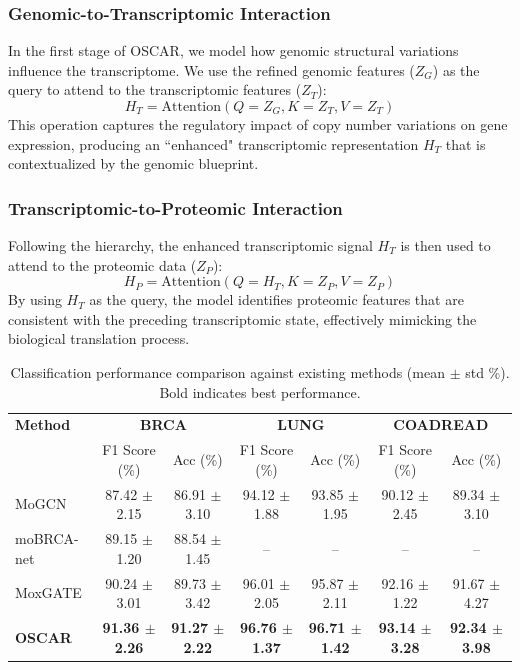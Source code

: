 \documentclass[lettersize,journal]{IEEEtran}
\begin{document}
\subsubsection{Genomic-to-Transcriptomic Interaction}
In the first stage of OSCAR, we model how genomic structural variations influence the transcriptome. We use the refined genomic features ($Z_G$) as the query to attend to the transcriptomic features ($Z_T$):
\begin{equation}
    H_T = \text{Attention}(Q=Z_G, K=Z_T, V=Z_T)
\end{equation}
This operation captures the regulatory impact of copy number variations on gene expression, producing an ``enhanced" transcriptomic representation $H_T$ that is contextualized by the genomic blueprint.

\subsubsection{Transcriptomic-to-Proteomic Interaction}
Following the hierarchy, the enhanced transcriptomic signal $H_T$ is then used to attend to the proteomic data ($Z_P$):
\begin{equation}
    H_P = \text{Attention}(Q=H_T, K=Z_P, V=Z_P)
\end{equation}
By using $H_T$ as the query, the model identifies proteomic features that are consistent with the preceding transcriptomic state, effectively mimicking the biological translation process.


\begin{table}[htbp]
\centering
\small
\caption{Classification performance comparison against existing methods (mean $\pm$ std \%). Bold indicates best performance.}
\label{tab:results}
\begin{tabular}{l|cc|cc|cc}
\hline
\textbf{Method} & \multicolumn{2}{c|}{\textbf{BRCA}} & \multicolumn{2}{c|}{\textbf{LUNG}} & \multicolumn{2}{c}{\textbf{COADREAD}} \\
 & F1 Score (\%) & Acc (\%) & F1 Score (\%) & Acc (\%) & F1 Score (\%) & Acc (\%) \\ \hline
MoGCN \cite{MoGCN2022} & 87.42 $\pm$ 2.15 & 86.91 $\pm$ 3.10 & 94.12 $\pm$ 1.88 & 93.85 $\pm$ 1.95 & 90.12 $\pm$ 2.45 & 89.34 $\pm$ 3.10 \\
moBRCA-net \cite{moBRCAnat2023} & 89.15 $\pm$ 1.20 & 88.54 $\pm$ 1.45 & -- & -- & -- & -- \\
MoxGATE \cite{MoxGATE2023} & 90.24 $\pm$ 3.01 & 89.73 $\pm$ 3.42 & 96.01 $\pm$ 2.05 & 95.87 $\pm$ 2.11 & 92.16 $\pm$ 1.22 & 91.67 $\pm$ 4.27 \\ \hline
\textbf{OSCAR} & \textbf{91.36 $\pm$ 2.26} & \textbf{91.27 $\pm$ 2.22} & \textbf{96.76 $\pm$ 1.37} & \textbf{96.71 $\pm$ 1.42} & \textbf{93.14 $\pm$ 3.28} & \textbf{92.34 $\pm$ 3.98} \\ \hline
\end{tabular}
\end{table}
\end{document}
